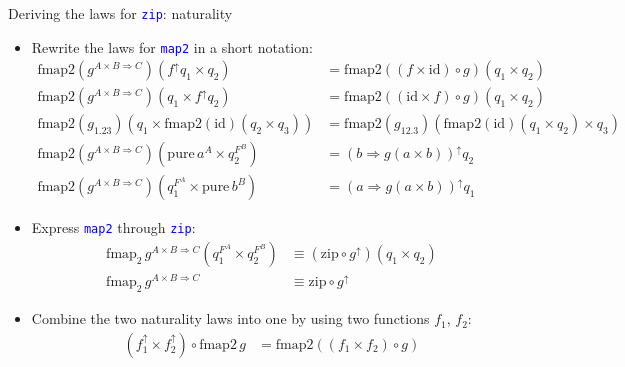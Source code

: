 \documentclass[english]{beamer}
\begin{document}
\begin{frame}{Deriving the laws for \texttt{\textcolor{blue}{\footnotesize{}zip}}:
naturality}
\begin{itemize}
\item \vspace{-0.2cm}Rewrite the laws for \texttt{\textcolor{blue}{\footnotesize{}map2}}
in a short notation:{\footnotesize{}
\begin{align*}
\text{fmap2}\left(g^{A\times B\Rightarrow C}\right)\left(f^{\uparrow}q_{1}\times q_{2}\right) & =\text{fmap2}\left(\left(f\times\text{id}\right)\circ g\right)\left(q_{1}\times q_{2}\right)\\
\text{fmap2}\left(g^{A\times B\Rightarrow C}\right)\left(q_{1}\times f^{\uparrow}q_{2}\right) & =\text{fmap2}\left(\left(\text{id}\times f\right)\circ g\right)\left(q_{1}\times q_{2}\right)\\
\text{fmap2}\left(g_{1.23}\right)\left(q_{1}\times\text{fmap2}\left(\text{id}\right)\left(q_{2}\times q_{3}\right)\right) & =\text{fmap2}\left(g_{12.3}\right)\left(\text{fmap2}\left(\text{id}\right)\left(q_{1}\times q_{2}\right)\times q_{3}\right)\\
\text{fmap2}\left(g^{A\times B\Rightarrow C}\right)\left(\text{pure}\,a^{A}\times q_{2}^{F^{B}}\right) & =\left(b\Rightarrow g\left(a\times b\right)\right)^{\uparrow}q_{2}\\
\text{fmap2}\left(g^{A\times B\Rightarrow C}\right)\left(q_{1}^{F^{A}}\times\text{pure}\,b^{B}\right) & =\left(a\Rightarrow g\left(a\times b\right)\right)^{\uparrow}q_{1}
\end{align*}
}{\footnotesize \par}
\item Express \texttt{\textcolor{blue}{\footnotesize{}map2}} through \texttt{\textcolor{blue}{\footnotesize{}zip}}:{\footnotesize{}
\begin{align*}
\text{fmap}_{2}\,g^{A\times B\Rightarrow C}\left(q_{1}^{F^{A}}\times q_{2}^{F^{B}}\right) & \equiv\left(\text{zip}\circ g^{\uparrow}\right)\left(q_{1}\times q_{2}\right)\\
\text{fmap}_{2}\,g^{A\times B\Rightarrow C} & \equiv\text{zip}\circ g^{\uparrow}
\end{align*}
}{\footnotesize \par}
\item Combine the two naturality laws into one by using two functions $f_{1}$,
$f_{2}$:{\footnotesize{}
\begin{align*}
\left(f_{1}^{\uparrow}\times f_{2}^{\uparrow}\right)\circ\text{fmap2}\,g & =\text{fmap2}\left(\left(f_{1}\times f_{2}\right)\circ g\right)\\

\end{align*}}
\end{itemize}
\end{frame}
\end{document}
